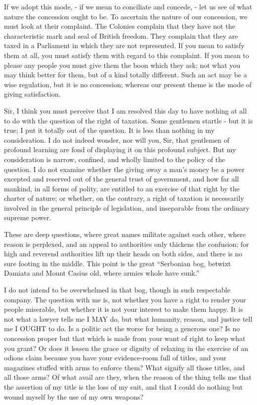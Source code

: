 If we adopt this mode, - if we mean to conciliate and concede, - let us see of what nature the concession ought to be. To ascertain the nature of our concession, we must look at their complaint. The Colonies complain that they have not the characteristic mark and seal of British freedom. They complain that they are taxed in a Parliament in which they are not represented. If you mean to satisfy them at all, you must satisfy them with regard to this complaint. If you mean to please any people you must give them the boon which they ask; not what you may think better for them, but of a kind totally different. Such an act may be a wise regulation, but it is no concession; whereas our present theme is the mode of giving satisfaction.\par

Sir, I think you must perceive that I am resolved this day to have nothing at all to do with the question of the right of taxation. Some gentlemen startle - but it is true; I put it totally out of the question. It is less than nothing in my consideration. I do not indeed wonder, nor will you, Sir, that gentlemen of profound learning are fond of displaying it on this profound subject. But my consideration is narrow, confined, and wholly limited to the policy of the question. I do not examine whether the giving away a man’s money be a power excepted and reserved out of the general trust of government, and how far all mankind, in all forms of polity, are entitled to an exercise of that right by the charter of nature; or whether, on the contrary, a right of taxation is necessarily involved in the general principle of legislation, and inseparable from the ordinary supreme power.\par

These are deep questions, where great names militate against each other, where reason is perplexed, and an appeal to authorities only thickens the confusion; for high and reverend authorities lift up their heads on both sides, and there is no sure footing in the middle. This point is the great “Serbonian bog, betwixt Damiata and Mount Casius old, where armies whole have sunk.”\par

I do not intend to be overwhelmed in that bog, though in such respectable company. The question with me is, not whether you have a right to render your people miserable, but whether it is not your interest to make them happy. It is not what a lawyer tells me I MAY do, but what humanity, reason, and justice tell me I OUGHT to do. Is a politic act the worse for being a generous one? Is no concession proper but that which is made from your want of right to keep what you grant? Or does it lessen the grace or dignity of relaxing in the exercise of an odious claim because you have your evidence-room full of titles, and your magazines stuffed with arms to enforce them? What signify all those titles, and all those arms? Of what avail are they, when the reason of the thing tells me that the assertion of my title is the loss of my suit, and that I could do nothing but wound myself by the use of my own weapons?\par

